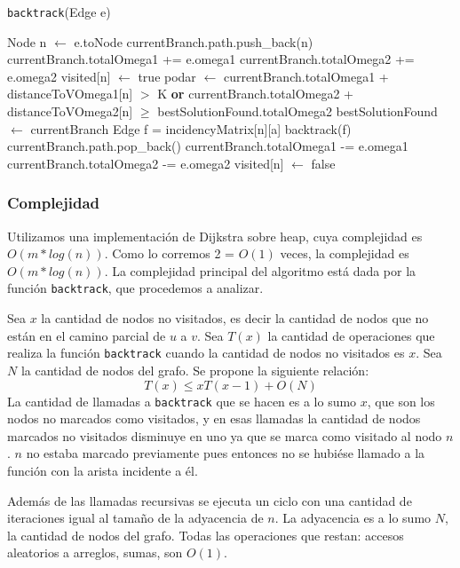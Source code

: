 \begin{algorithm}[H]
    \caption{\texttt{backtrack}(Edge e)}
\begin{algorithmic}[1]
  \State Node n $\leftarrow$ e.toNode
  \State currentBranch.path.push\_back(n)
  \State currentBranch.totalOmega1 += e.omega1
  \State currentBranch.totalOmega2 += e.omega2
  \State visited[n] $\leftarrow$ true
  \State podar $\leftarrow$ currentBranch.totalOmega1 + distanceToVOmega1[n] $>$ K \textbf{or} currentBranch.totalOmega2 + distanceToVOmega2[n] $\geq$ bestSolutionFound.totalOmega2
      \State bestSolutionFound $\leftarrow$ currentBranch
  \Else{}
          \State Edge f = incidencyMatrix[n][a]
          \State backtrack(f)
	\EndIf
      \EndFor
  \EndIf
  \EndIf
  \State currentBranch.path.pop\_back()
  \State currentBranch.totalOmega1 -= e.omega1
  \State currentBranch.totalOmega2 -= e.omega2
  \State visited[n] $\leftarrow$ false
\end{algorithmic}
\end{algorithm}

\subsubsection{Complejidad}

Utilizamos una implementación de Dijkstra sobre heap, cuya complejidad es $O(m * log(n))$. Como lo corremos 2 = $O(1)$ veces, la complejidad es $O(m * log(n))$. La complejidad principal del algoritmo está dada por la función \texttt{backtrack}, que procedemos a analizar.

Sea $x$ la cantidad de nodos no visitados, es decir la cantidad de nodos que no están en el camino parcial de $u$ a $v$. Sea $T(x)$ la cantidad de operaciones que realiza la función \texttt{backtrack} cuando la cantidad de nodos no visitados es $x$. Sea $N$ la cantidad de nodos del grafo. Se propone la siguiente relación:
\[
    T(x) \leq x T(x-1) + O(N)
\]
La cantidad de llamadas a \texttt{backtrack} que se hacen es a lo sumo $x$, que son los nodos no marcados como visitados, y en esas llamadas la cantidad de nodos marcados no visitados disminuye en uno ya que se marca como visitado al nodo $n$. $n$ no estaba marcado previamente pues entonces no se hubiése llamado a la función con la arista incidente a él.

Además de las llamadas recursivas se ejecuta un ciclo con una cantidad de iteraciones igual al tamaño de la adyacencia de $n$. La adyacencia es a lo sumo $N$, la cantidad de nodos del grafo. Todas las operaciones que restan: accesos aleatorios a arreglos, sumas, son $O(1)$.

